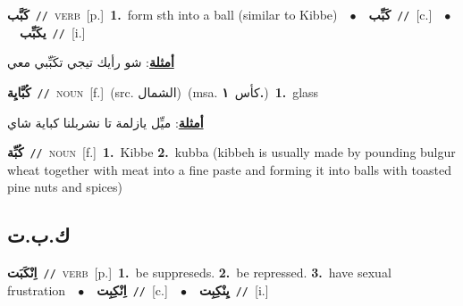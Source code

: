 \documentclass[10pt,a4paper,twoside]{article} %
\begin{document}
\begin{multicols}{2}
{\setlength\topsep{0pt}\textbf{\foreignlanguage{arabic}{كَبَّب}}\ {\color{gray}\texttt{//}\color{black}}\ \textsc{verb}\ [p.]\ \textbf{1.}~form sth into a ball (similar to Kibbe)\ \ $\bullet$\ \ \setlength\topsep{0pt}\textbf{\foreignlanguage{arabic}{كَبِّب}}\ {\color{gray}\texttt{//}\color{black}}\ [c.]\ \ $\bullet$\ \ \setlength\topsep{0pt}\textbf{\foreignlanguage{arabic}{يكَبِّب}}\ {\color{gray}\texttt{//}\color{black}}\ [i.]\  \begin{flushright}\color{gray}\foreignlanguage{arabic}{\textbf{\underline{\foreignlanguage{arabic}{أمثلة}}}: شو رأيك تيجي تكَبِّبي معي}\end{flushright}\color{black}} \vspace{2mm}

{\setlength\topsep{0pt}\textbf{\foreignlanguage{arabic}{كُبَّايِة}}\ {\color{gray}\texttt{//}\color{black}}\ \textsc{noun}\ [f.]\ (src. \color{gray}\foreignlanguage{arabic}{الشمال}\color{black})\ \color{gray}(msa. \foreignlanguage{arabic}{كأس}~\foreignlanguage{arabic}{\textbf{١.}})\color{black}\ \textbf{1.}~glass\  \begin{flushright}\color{gray}\foreignlanguage{arabic}{\textbf{\underline{\foreignlanguage{arabic}{أمثلة}}}: ميِّل يازلمة تا نشربلنا كباية شاي}\end{flushright}\color{black}} \vspace{2mm}

{\setlength\topsep{0pt}\textbf{\foreignlanguage{arabic}{كُبِّة}}\ {\color{gray}\texttt{//}\color{black}}\ \textsc{noun}\ [f.]\ \textbf{1.}~Kibbe  \textbf{2.}~kubba (kibbeh is usually made by pounding bulgur wheat together with meat into a fine paste and forming it into balls with toasted pine nuts and spices)\ } \vspace{2mm}

\vspace{-3mm}
\subsection*{\color{blue}\foreignlanguage{arabic}{ك.ب.ت}\color{blue}{}} 

{\setlength\topsep{0pt}\textbf{\foreignlanguage{arabic}{اِنْكَبَت}}\ {\color{gray}\texttt{//}\color{black}}\ \textsc{verb}\ [p.]\ \textbf{1.}~be suppreseds.  \textbf{2.}~be repressed.  \textbf{3.}~have sexual frustration\ \ $\bullet$\ \ \setlength\topsep{0pt}\textbf{\foreignlanguage{arabic}{اِنْكِبِت}}\ {\color{gray}\texttt{//}\color{black}}\ [c.]\ \ $\bullet$\ \ \setlength\topsep{0pt}\textbf{\foreignlanguage{arabic}{يِنْكِبِت}}\ {\color{gray}\texttt{//}\color{black}}\ [i.]\ } \vspace{2mm}


\end{multicols}
\end{document}
